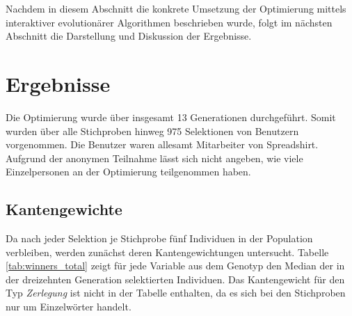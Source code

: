 Nachdem in diesem Abschnitt die konkrete Umsetzung der Optimierung mittels interaktiver evolutionärer Algorithmen beschrieben wurde, folgt im nächsten Abschnitt die Darstellung und Diskussion der Ergebnisse.

\section{Ergebnisse}

Die Optimierung wurde über insgesamt \num{13} Generationen durchgeführt. Somit wurden über alle Stichproben hinweg \num{975} Selektionen von Benutzern vorgenommen. Die Benutzer waren allesamt Mitarbeiter von Spreadshirt. Aufgrund der anonymen Teilnahme lässt sich nicht angeben, wie viele Einzelpersonen an der Optimierung teilgenommen haben.

\subsection{Kantengewichte}

Da nach jeder Selektion je Stichprobe fünf Individuen in der Population verbleiben, werden zunächst deren Kantengewichtungen untersucht. Tabelle \ref{tab:winners_total} zeigt für jede Variable aus dem Genotyp den Median der in der dreizehnten Generation selektierten Individuen. Das Kantengewicht für den Typ \emph{Zerlegung} ist nicht in der Tabelle enthalten, da es sich bei den Stichproben nur um Einzelwörter handelt.

